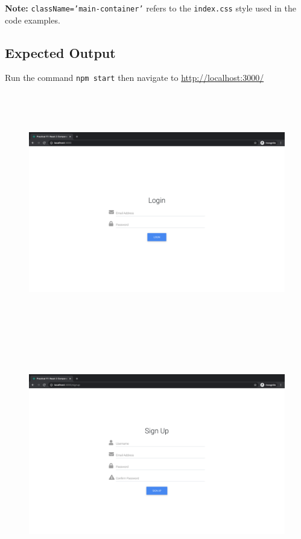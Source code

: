\documentclass{article}
\begin{document}
\textbf{Note:} \texttt{className='main-container'} refers to the \texttt{index.css} style used in the code examples.

\subsection*{Expected Output} 
Run the command \texttt{npm start} then navigate to \href{http://localhost:3000/}{http://localhost:3000/} \\

\begin{figure}[H]
  \includegraphics[width=175mm, height=105mm]{./img/17-expected-form-1.png}
  \includegraphics[width=175mm, height=105mm]{./img/17-expected-form-2.png}
\end{figure}
\end{document}
